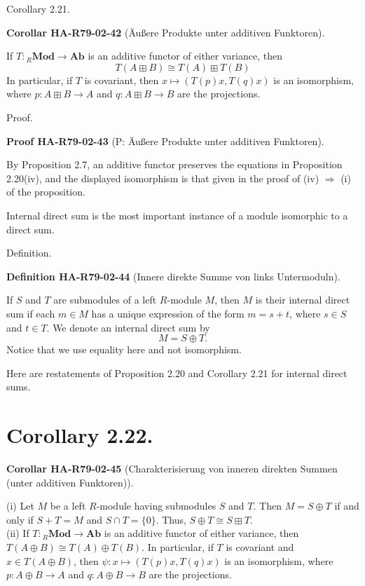 \documentclass[10pt, letterpaper]{article}
\newcommand{\CustomHeading}[3]{%
  \par\medskip\noindent%
  \textbf{#1 #2} \textnormal{(#3)}.\enskip%
}
\newenvironment{DEF}[2]{\begin{unitbox}\CustomHeading{Definition}{#1}{#2}}{\end{unitbox}}
\newenvironment{KORO}[2]{\begin{unitbox}\CustomHeading{Corollar}{#1}{#2}}{\end{unitbox}}
\newenvironment{PROOF}[2]{\begin{unitbox}\CustomHeading{Proof}{#1}{#2}}{\end{unitbox}}
\begin{document}
Corollary 2.21. 


\begin{KORO}{HA-R79-02-42}{Äußere Produkte unter additiven Funktoren}
If $T:{ }_{R} \mathbf{M o d} \rightarrow \mathbf{A b}$ is an additive functor of either variance, then
$$
T(A \boxplus B) \cong T(A) \boxplus T(B)
$$
In particular, if $T$ is covariant, then $x \mapsto(T(p) x, T(q) x)$ is an isomorphism, where $p: A \boxplus B \rightarrow A$ and $q: A \boxplus B \rightarrow B$ are the projections.
\end{KORO}



Proof. 

\begin{PROOF}{HA-R79-02-43}{P: Äußere Produkte unter additiven Funktoren}
By Proposition 2.7, an additive functor preserves the equations in Proposition 2.20(iv), and the displayed isomorphism is that given in the proof of (iv) $\Rightarrow$ (i) of the proposition.
\end{PROOF}


Internal direct sum is the most important instance of a module isomorphic to a direct sum.



Definition. 


\begin{DEF}{HA-R79-02-44}{Innere direkte Summe von links Untermoduln}
If $S$ and $T$ are submodules of a left $R$-module $M$, then $M$ is their internal direct sum if each $m \in M$ has a unique expression of the form $m=s+t$, where $s \in S$ and $t \in T$. We denote an internal direct sum by
$$
M=S \oplus T .
$$
Notice that we use equality here and not isomorphism.
\end{DEF}


Here are restatements of Proposition 2.20 and Corollary 2.21 for internal direct sums.

\section*{Corollary 2.22.}


\begin{KORO}{HA-R79-02-45}{Charakterisierung von inneren direkten Summen (unter additiven Funktoren)}
(i) Let $M$ be a left $R$-module having submodules $S$ and $T$. Then $M=S \oplus T$ if and only if $S+T=M$ and $S \cap T=\{0\}$. Thus, $S \oplus T \cong S \boxplus T$.\\


(ii) If $T:{ }_{R} \mathbf{M o d} \rightarrow \mathbf{A b}$ is an additive functor of either variance, then $T(A \oplus B) \cong T(A) \oplus T(B)$. In particular, if $T$ is covariant and $x \in T(A \oplus B)$, then $\psi: x \mapsto(T(p) x, T(q) x)$ is an isomorphism, where $p: A \oplus B \rightarrow A$ and $q: A \oplus B \rightarrow B$ are the projections.
\end{KORO}
\end{document}
